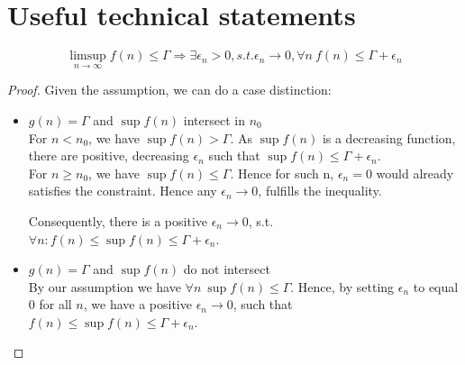 \section{Useful technical statements}\label{section:technical_proofs}
  \begin{lemma}\label{lemma_lim_sup}
  \[ \limsup_{n \rightarrow \infty} f(n) \leq \Gamma \Rightarrow \exists \epsilon_n > 0, s.t. \epsilon_n \rightarrow 0, \forall n\ f(n) \leq \Gamma + \epsilon_n\]
  \end{lemma}
  \begin{proof}
    Given the assumption, we can do a case distinction:
    \begin{itemize}
    \item $g(n) = \Gamma$ and $\sup f(n)$ intersect in $n_0$ \\
    For $n < n_0$, we have $\sup f(n) > \Gamma$. As $\sup f(n)$ is a decreasing function, there are positive, decreasing $\epsilon_n$ such that $\sup f(n) \leq \Gamma + \epsilon_n$. \\
    For $n \geq n_0$, we have $\sup f(n) \leq \Gamma$. Hence for such n, $\epsilon_n = 0$ would already satisfies the constraint. Hence any $\epsilon_n \rightarrow 0$, fulfills the inequality.

    Consequently, there is a positive $\epsilon_n \rightarrow 0$, s.t. $\forall n: f(n) \leq \sup f(n) \leq \Gamma + \epsilon_n$.

    \item $g(n) = \Gamma$ and $\sup f(n)$ do not intersect \\
    By our assumption we have $\forall n\ \sup f(n) \leq \Gamma$.
    Hence, by setting $\epsilon_n$ to equal 0 for all $n$, we have a positive $\epsilon_n \rightarrow 0$, such that $f(n) \leq \sup f(n) \leq \Gamma + \epsilon_n$.
    \end{itemize}
  \end{proof}
